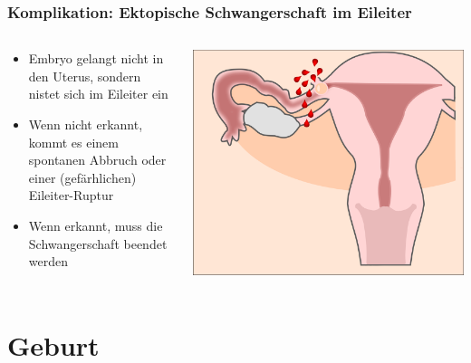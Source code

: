 \documentclass{beamer}
\begin{document}
\begin{frame}
\frametitle{Komplikation: Ektopische Schwangerschaft im Eileiter}


\begin{columns}[c]
\begin{column}{5cm}

\begin{itemize}

\item
Embryo gelangt nicht in den Uterus, sondern nistet sich im Eileiter ein
\item
Wenn nicht erkannt,  kommt es  einem spontanen Abbruch oder einer (gefärhlichen) Eileiter-Ruptur
\item
Wenn erkannt, muss die Schwangerschaft beendet werden
\end{itemize}

\end{column}

\begin{column}{5cm}

\begin{center}
\includegraphics[width=\textwidth]{Eileiterruptur.png}
\end{center}


\end{column}
\end{columns}


\end{frame}



\section{Geburt}
\end{document}
